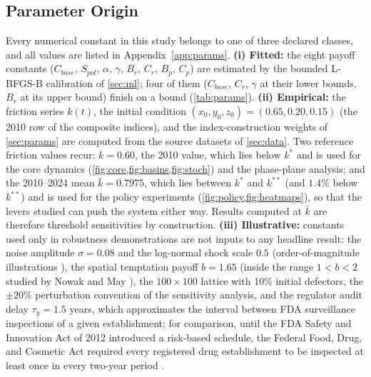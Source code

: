 \documentclass[10pt]{article}
\newcommand{\kbar}{\bar{k}}
\begin{document}
\subsection{Parameter Origin}\label{sec:provenance}
Every numerical constant in this study belongs to one of three declared classes, and all values are listed in Appendix~\ref{app:params}. \textbf{(i) Fitted:} the eight payoff constants ($C_{base}$, $S_{pol}$, $\alpha$, $\gamma$, $B_r$, $C_r$, $B_p$, $C_p$) are estimated by the bounded L-BFGS-B calibration of \cref{sec:ml}; four of them ($C_{base}$, $C_r$, $\gamma$ at their lower bounds, $B_r$ at its upper bound) finish on a bound (\cref{tab:params}). \textbf{(ii) Empirical:} the friction series $k(t)$, the initial condition $(x_0,y_0,z_0)=(0.65,0.20,0.15)$ (the 2010 row of the composite indices), and the index-construction weights of \cref{sec:params} are computed from the source datasets of \cref{sec:data}. Two reference friction values recur: $k=0.60$, the 2010 value, which lies below $k^*$ and is used for the core dynamics (\cref{fig:core,fig:basins,fig:stoch}) and the phase-plane analysis; and the 2010--2024 mean $\kbar=0.7975$, which lies between $k^*$ and $k^{**}$ (and $1.4\%$ below $k^{**}$) and is used for the policy experiments (\cref{fig:policy,fig:heatmaps}), so that the levers studied can push the system either way. Results computed at $\kbar$ are therefore threshold sensitivities by construction. \textbf{(iii) Illustrative:} constants used only in robustness demonstrations are not inputs to any headline result: the noise amplitude $\sigma=0.08$ and the log-normal shock scale $0.5$ (order-of-magnitude illustrations \cite{oksendal2003}), the spatial temptation payoff $b=1.65$ (inside the range $1<b<2$ studied by Nowak and May \cite{nowak1992}), the $100\times100$ lattice with 10\% initial defectors, the $\pm20\%$ perturbation convention of the sensitivity analysis, and the regulator audit delay $\tau_y=1.5$ years, which approximates the interval between FDA surveillance inspections of a given establishment; for comparison, until the FDA Safety and Innovation Act of 2012 introduced a risk-based schedule, the Federal Food, Drug, and Cosmetic Act required every registered drug establishment to be inspected at least once in every two-year period \cite{fdca510h}.
\end{document}

